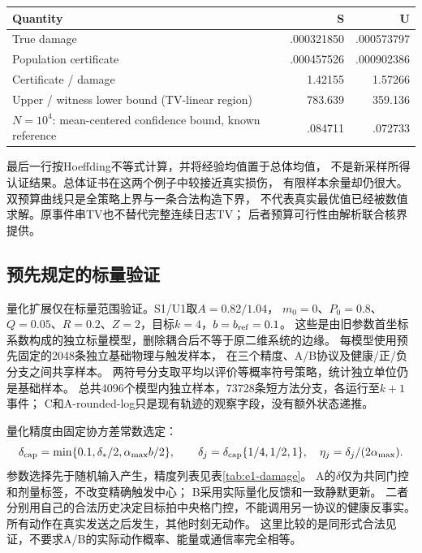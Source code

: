 \begin{table}[ht]
\centering\footnotesize
{}
\begin{tabular}{lrr}
\toprule
Quantity & S & U\\
\midrule
True damage & .000321850 & .000573797\\
Population certificate & .000457526 & .000902386\\
Certificate / damage & 1.42155 & 1.57266\\
Upper / witness lower bound (TV-linear region) & 783.639 & 359.136\\
$N=10^4$: mean-centered confidence bound, known reference & .084711 & .072733\\
\bottomrule
\end{tabular}
\end{table}
最后一行按Hoeffding不等式计算，并将经验均值置于总体均值，
不是新采样所得认证结果。总体证书在这两个例子中较接近真实损伤，
有限样本余量却仍很大。双预算曲线只是全策略上界与一条合法构造下界，
不代表真实最优值已经被数值求解。原事件串TV也不替代完整连续日志TV；
后者预算可行性由解析联合核界提供。

\subsection{预先规定的标量验证}
量化扩展仅在标量范围验证。S1/U1取$A=0.82/1.04$，
$m_0=0$、$P_0=0.8$、$Q=0.05$、$R=0.2$、$Z=2$，目标$k=4$，$b=b_{\rm ref}=0.1$。
这些是由旧参数首坐标系数构成的独立标量模型，删除耦合后不等于原二维系统的边缘。
每模型使用预先固定的2048条独立基础物理与触发样本，
在三个精度、A/B协议及健康/正/负分支之间共享样本。
两符号分支取平均以评价等概率符号策略，统计独立单位仍是基础样本。
总共4096个模型内独立样本，73728条短方法分支，各运行至$k+1$事件；
C和A-rounded-log只是现有轨迹的观察字段，没有额外状态递推。

量化精度由固定协方差常数选定：
\[
\delta_{\rm cap}=\min\{0.1,\delta_*/2,\alpha_{\max}b/2\},\qquad
\delta_j=\delta_{\rm cap}\{1/4,1/2,1\},\quad
\eta_j=\delta_j/(2\alpha_{\max}).
\]
参数选择先于随机输入产生，精度列表见表\ref{tab:e1-damage}。
A的$\delta$仅为共同门控和剂量标签，不改变精确触发中心；
B采用实际量化反馈和一致静默更新。
二者分别用自己的合法历史决定目标拍中央格门控，不能调用另一协议的健康反事实。
所有动作在真实发送之后发生，其他时刻无动作。
这里比较的是同形式合法见证，不要求A/B的实际动作概率、能量或通信率完全相等。

